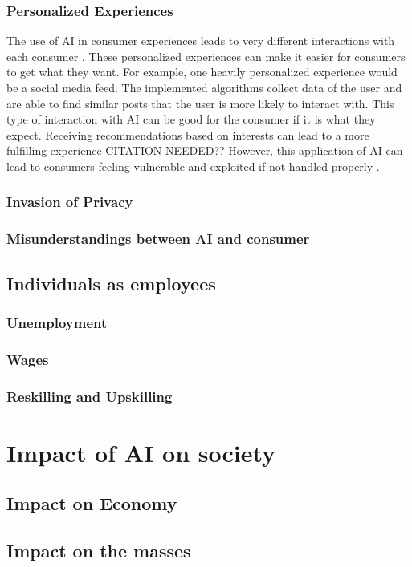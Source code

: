 \documentclass[12pt, man]{apa6}
\begin{document}
\subsubsection*{Personalized Experiences}
The use of AI in consumer experiences leads to very different interactions with each consumer \parencite{Puntoni2021}.  These personalized experiences can make it easier for consumers to get what they want.  For example, one heavily personalized experience would be a social media feed.  The implemented algorithms collect data of the user and are able to find similar posts that the user is more likely to interact with.
This type of interaction with AI can be good for the consumer if it is what they expect.  Receiving recommendations based on interests can lead to a more fulfilling experience CITATION NEEDED??  However, this application of AI can lead to consumers feeling vulnerable and exploited if not handled properly \parencite{Aguirre2015}.

\subsubsection*{Invasion of Privacy}

\subsubsection*{Misunderstandings between AI and consumer}

\subsection*{Individuals as employees}
\subsubsection*{Unemployment}
\subsubsection*{Wages}
\subsubsection*{Reskilling and Upskilling}

\section*{Impact of AI on society}
\subsection*{Impact on Economy}

\subsection*{Impact on the masses}

\printbibliography
\end{document}
